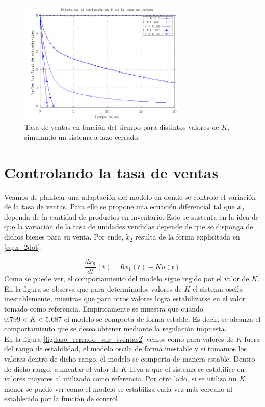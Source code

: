 \documentclass{sig-alternate}
\begin{document}
\begin{figure}[h]
\begin{center}
\includegraphics[width=8cm]{../src/k_plot3.png}
\caption{\label{fig:lazo_cerrado_var_tventas1}Tasa de ventas en función del tiempo para distintos valores de $K$, simulando un sistema
a lazo cerrado.}
\end{center}
\end{figure}

\section{Controlando la tasa de ventas}
\label{salesrate_control_section}
Veamos de plantear una adaptación del modelo en donde se controle el variación de la tasa de ventas. Para ello se propone una ecuación diferencial
tal que $\dot{x}_{2}$ dependa de la cantidad de productos en inventario. Esto se sustenta en la idea de que la variación de la tasa de unidades
vendidas depende de que se disponga de dichos bienes para su venta. Por ende, $\dot{x}_{2}$ resulta de la forma explicitada en \eqref{eq:x_2dot}.

\begin{equation}
 \label{eq:x_2dot}
 \frac{dx_{2}}{dt}(t) = 6x_1(t) - Ku(t)
\end{equation}
Como se puede ver, el comportamiento del modelo sigue regido por el valor de $K$. En la figura se observa que para determinados valores de $K$ el sistema
oscila inestablemente, mientras que para otros valores logra estabilizarse en el valor tomado como referencia. Empíricamente se muestra que cuando $0.799 < K < 5.687$ el modelo se comporta de forma estable. 
Es decir, se alcanza el comportamiento que se desea obtener mediante la regulación impuesta.\\
En la figura \ref{fig:lazo_cerrado_var_tventas2} vemos como para valores de $K$ fuera del rango de estabilidad, el modelo oscila de
forma inestable y si tomamos los valores dentro de dicho rango, el modelo se comporta de manera estable. Dentro de dicho rango, aumentar el 
valor de $K$ lleva a que el sistema se estabilice en valores mayores al utilizado como referencia. Por otro lado, si se utiliza un $K$ menor se puede ver como el 
modelo se estabiliza cada vez más cercano al establecido por la función de control.
\end{document}
